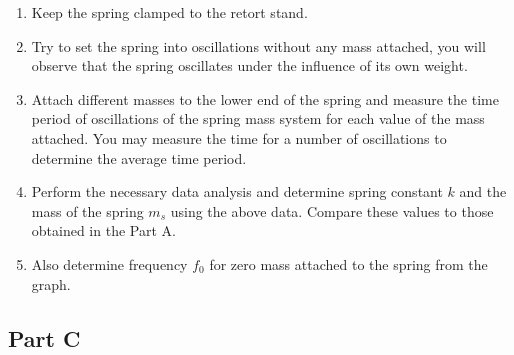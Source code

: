 \begin{enumerate}
\item Keep the spring clamped to the retort stand.

\item Try to set the spring into oscillations without any mass attached, you will observe that
the spring oscillates under the influence of its own weight.

\item Attach different masses to the lower end of the spring and measure the time period of oscillations of the spring mass system for each value of the mass attached. You may measure the time for a number of oscillations to determine the average time period.

\item Perform the necessary data analysis and determine spring constant $k$ and the mass of the spring $m_s$ using the above data. Compare these values to those obtained in the Part A.

\item Also determine frequency $f_0$ for zero mass attached to the spring from the graph.

\end{enumerate}


\subsection*{Part C}

